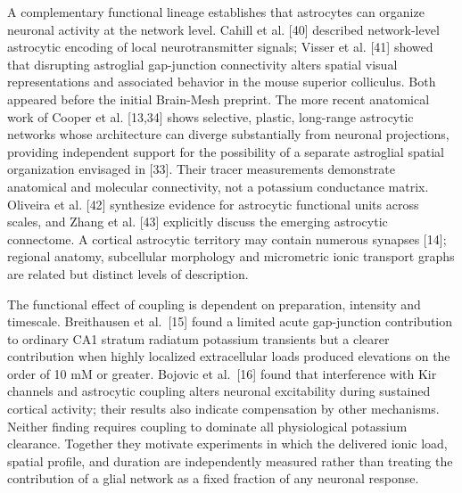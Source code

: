 \documentclass[
  11pt,
]{article}
\begin{document}
A complementary functional lineage establishes that astrocytes can organize neuronal activity at the network level. Cahill et al. {[}40{]} described network-level astrocytic encoding of local neurotransmitter signals; Visser et al. {[}41{]} showed that disrupting astroglial gap-junction connectivity alters spatial visual representations and associated behavior in the mouse superior colliculus. Both appeared before the initial Brain-Mesh preprint. The more recent anatomical work of Cooper et al. {[}13,34{]} shows selective, plastic, long-range astrocytic networks whose architecture can diverge substantially from neuronal projections, providing independent support for the possibility of a separate astroglial spatial organization envisaged in {[}33{]}. Their tracer measurements demonstrate anatomical and molecular connectivity, not a potassium conductance matrix. Oliveira et al. {[}42{]} synthesize evidence for astrocytic functional units across scales, and Zhang et al. {[}43{]} explicitly discuss the emerging astrocytic connectome. A cortical astrocytic territory may contain numerous synapses {[}14{]}; regional anatomy, subcellular morphology and micrometric ionic transport graphs are related but distinct levels of description.

The functional effect of coupling is dependent on preparation, intensity
and timescale. Breithausen et al.~{[}15{]} found a limited acute
gap-junction contribution to ordinary CA1 stratum radiatum potassium
transients but a clearer contribution when highly localized
extracellular loads produced elevations on the order of 10 mM or
greater. Bojovic et al.~{[}16{]} found that interference with Kir
channels and astrocytic coupling alters neuronal excitability during
sustained cortical activity; their results also indicate compensation by
other mechanisms. Neither finding requires coupling to dominate all
physiological potassium clearance. Together they motivate experiments in
which the delivered ionic load, spatial profile, and duration are
independently measured rather than treating the contribution of a glial
network as a fixed fraction of any neuronal response.
\end{document}
